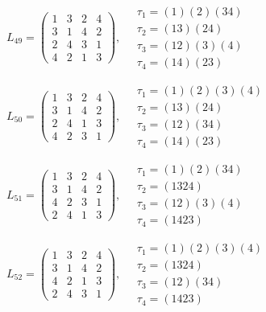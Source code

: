 $L_{49} = \begin{pmatrix} 1 & 3 & 2 & 4 \\ 3 & 1 & 4 & 2 \\ 2 & 4 & 3 & 1 \\ 4 & 2 & 1 & 3 \end{pmatrix}, \quad \begin{matrix} \tau_{1} = (1)(2)(3 4) \\ \tau_{2} = (1 3)(2 4) \\ \tau_{3} = (1 2)(3)(4) \\ \tau_{4} = (1 4)(2 3) \end{matrix}$

$L_{50} = \begin{pmatrix} 1 & 3 & 2 & 4 \\ 3 & 1 & 4 & 2 \\ 2 & 4 & 1 & 3 \\ 4 & 2 & 3 & 1 \end{pmatrix}, \quad \begin{matrix} \tau_{1} = (1)(2)(3)(4) \\ \tau_{2} = (1 3)(2 4) \\ \tau_{3} = (1 2)(3 4) \\ \tau_{4} = (1 4)(2 3) \end{matrix}$

$L_{51} = \begin{pmatrix} 1 & 3 & 2 & 4 \\ 3 & 1 & 4 & 2 \\ 4 & 2 & 3 & 1 \\ 2 & 4 & 1 & 3 \end{pmatrix}, \quad \begin{matrix} \tau_{1} = (1)(2)(3 4) \\ \tau_{2} = (1 3 2 4) \\ \tau_{3} = (1 2)(3)(4) \\ \tau_{4} = (1 4 2 3) \end{matrix}$

$L_{52} = \begin{pmatrix} 1 & 3 & 2 & 4 \\ 3 & 1 & 4 & 2 \\ 4 & 2 & 1 & 3 \\ 2 & 4 & 3 & 1 \end{pmatrix}, \quad \begin{matrix} \tau_{1} = (1)(2)(3)(4) \\ \tau_{2} = (1 3 2 4) \\ \tau_{3} = (1 2)(3 4) \\ \tau_{4} = (1 4 2 3) \end{matrix}$

